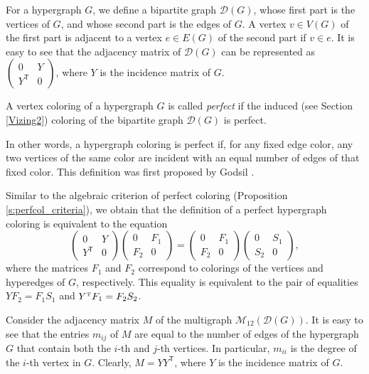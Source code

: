 \documentclass[11pt]{article}
\theoremstyle{definition}
\begin{document}
{{{For a hypergraph $G$, we define a bipartite graph $\mathcal{D}(G)$,
whose first part is the vertices of $G$, and whose  second part is the edges
of $G$. A vertex $v\in V(G)$ of the first part is adjacent to a vertex $e\in E(G)$ of the second
part if $v\in e$. It is easy to see that the adjacency matrix
of $\mathcal{D}(G)$ can be represented as
$\begin{pmatrix}
0 & Y \\
Y^{\mathsf T} & 0
\end{pmatrix}$, where $Y$ is the incidence matrix of $G$.

A vertex coloring of a hypergraph $G$ is called {\sl perfect} if
the induced (see Section \ref{Vizing2}) coloring of the bipartite graph $\mathcal{D}(G)$ is perfect.

In other words, a hypergraph coloring is
perfect if, for
any fixed edge color, any two vertices
of the same color are incident with an equal number of edges of that fixed 
color. 
This definition was first proposed by
Godsil \cite{Godsil95}. 

Similar to the algebraic criterion of perfect coloring (Proposition \ref{s:perfcol_criteria}), we obtain
that the definition of a perfect hypergraph coloring is equivalent to
the equation
$$
\begin{pmatrix}
0 & Y \\
Y^{\mathsf T} & 0
\end{pmatrix}
\begin{pmatrix}
0 & F_1\\
F_2 & 0
\end{pmatrix}=
\begin{pmatrix}
0 & F_1\\
F_2 & 0
\end{pmatrix}\begin{pmatrix}
0 & S_1\\
S_2 & 0
\end{pmatrix},
$$
where
the matrices $F_1$ and $F_2$ correspond to
colorings of the vertices and hyperedges of $G$, respectively. This
equality is equivalent to the pair of equalities $YF_2=F_1S_1$ and $Y^{\mbox{\rm \tiny
T}}F_1=F_2S_2$.

Consider the adjacency matrix $M$ of the multigraph
$\mathcal{M}_{12}(\mathcal{D}(G))$. It is easy to see that the entries
$m_{ij}$ of $M$ are equal to the number of edges of the hypergraph $G$ that
contain both the $i$-th and $j$-th vertices. In particular, $m_{ii}$
is the degree of the $i$-th vertex in $G$. Clearly,
$M=YY^{\mathsf T}$, where $Y$ is the incidence matrix of 
$G$.

}}}
\end{document}
